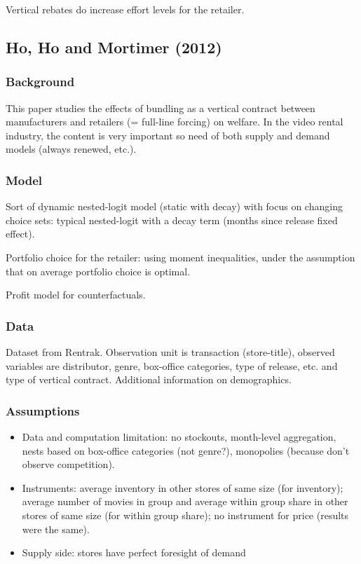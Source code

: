 Vertical rebates do increase effort levels for the retailer. 

\newpage
\subsection{Ho, Ho and Mortimer (2012)}

\subsubsection{Background}

This paper studies the effects of bundling as a vertical contract between manufacturers and retailers (= full-line forcing) on welfare. In the video rental industry, the content is very important so need of both supply and demand models (always renewed, etc.).

\subsubsection{Model}

Sort of dynamic nested-logit model (static with decay) with focus on changing choice sets: typical nested-logit with a decay term (months since release fixed effect).

Portfolio choice for the retailer: using moment inequalities, under the assumption that on average portfolio choice is optimal.

Profit model for counterfactuals.

\subsubsection{Data}

Dataset from Rentrak. Observation unit is transaction (store-title), observed variables are distributor, genre, box-office categories, type of release, etc. and type of vertical contract. Additional information on demographics.

\subsubsection{Assumptions}

\begin{itemize}
\item Data and computation limitation: no stockouts, month-level aggregation, nests based on box-office categories (not genre?), monopolies (because don't observe competition).
\item Instruments: average inventory in other stores of same size (for inventory); average number of movies in group and average within group share in other stores of same size (for within group share); no instrument for price (results were the same).
\item Supply side: stores have perfect foresight of demand
\end{itemize}

